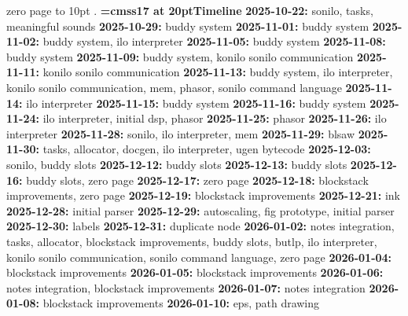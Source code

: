 \smallskip
\noindent zero page \leaders\hbox to 10pt {\hss.\hss}  \hfill {}
\smallskip
\vfill \break
{\medskip\noindent\bf\font\titlefont=cmss17 at 20pt\titlefont Timeline}\medskip
{\noindent \bf 2025-10-22:} sonilo, tasks, meaningful sounds\smallskip
{\noindent \bf 2025-10-29:} buddy system\smallskip
{\noindent \bf 2025-11-01:} buddy system\smallskip
{\noindent \bf 2025-11-02:} buddy system, ilo interpreter\smallskip
{\noindent \bf 2025-11-05:} buddy system\smallskip
{\noindent \bf 2025-11-08:} buddy system\smallskip
{\noindent \bf 2025-11-09:} buddy system, konilo sonilo communication\smallskip
{\noindent \bf 2025-11-11:} konilo sonilo communication\smallskip
{\noindent \bf 2025-11-13:} buddy system, ilo interpreter, konilo sonilo communication, mem, phasor, sonilo command language\smallskip
{\noindent \bf 2025-11-14:} ilo interpreter\smallskip
{\noindent \bf 2025-11-15:} buddy system\smallskip
{\noindent \bf 2025-11-16:} buddy system\smallskip
{\noindent \bf 2025-11-24:} ilo interpreter, initial dsp, phasor\smallskip
{\noindent \bf 2025-11-25:} phasor\smallskip
{\noindent \bf 2025-11-26:} ilo interpreter\smallskip
{\noindent \bf 2025-11-28:} sonilo, ilo interpreter, mem\smallskip
{\noindent \bf 2025-11-29:} blsaw\smallskip
{\noindent \bf 2025-11-30:} tasks, allocator, docgen, ilo interpreter, ugen bytecode\smallskip
{\noindent \bf 2025-12-03:} sonilo, buddy slots\smallskip
{\noindent \bf 2025-12-12:} buddy slots\smallskip
{\noindent \bf 2025-12-13:} buddy slots\smallskip
{\noindent \bf 2025-12-16:} buddy slots, zero page\smallskip
{\noindent \bf 2025-12-17:} zero page\smallskip
{\noindent \bf 2025-12-18:} blockstack improvements, zero page\smallskip
{\noindent \bf 2025-12-19:} blockstack improvements\smallskip
{\noindent \bf 2025-12-21:} ink\smallskip
{\noindent \bf 2025-12-28:} initial parser\smallskip
{\noindent \bf 2025-12-29:} autoscaling, fig prototype, initial parser\smallskip
{\noindent \bf 2025-12-30:} labels\smallskip
{\noindent \bf 2025-12-31:} duplicate node\smallskip
{\noindent \bf 2026-01-02:} notes integration, tasks, allocator, blockstack improvements, buddy slots, butlp, ilo interpreter, konilo sonilo communication, sonilo command language, zero page\smallskip
{\noindent \bf 2026-01-04:} blockstack improvements\smallskip
{\noindent \bf 2026-01-05:} blockstack improvements\smallskip
{\noindent \bf 2026-01-06:} notes integration, blockstack improvements\smallskip
{\noindent \bf 2026-01-07:} notes integration\smallskip
{\noindent \bf 2026-01-08:} blockstack improvements\smallskip
{\noindent \bf 2026-01-10:} eps, path drawing\smallskip
